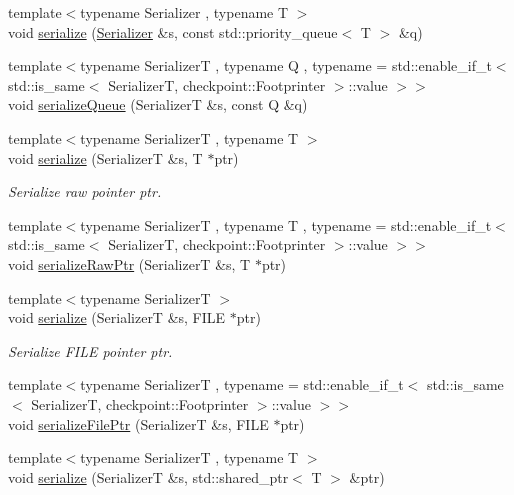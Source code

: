 \begin{DoxyCompactItemize}
{\footnotesize template$<$typename Serializer , typename T $>$ }\\void \hyperlink{namespacecheckpoint_a9493433bed418b54358130463961ce50}{serialize} (\hyperlink{structcheckpoint_1_1_serializer}{Serializer} \&s, const std\+::priority\+\_\+queue$<$ T $>$ \&q)
\item 
{\footnotesize template$<$typename SerializerT , typename Q , typename  = std\+::enable\+\_\+if\+\_\+t$<$    std\+::is\+\_\+same$<$      Serializer\+T,      checkpoint\+::\+Footprinter    $>$\+::value  $>$$>$ }\\void \hyperlink{namespacecheckpoint_a2d9ca0472b4055b11e967503e9b37394}{serialize\+Queue} (SerializerT \&s, const Q \&q)
\item 
{\footnotesize template$<$typename SerializerT , typename T $>$ }\\void \hyperlink{namespacecheckpoint_a40ba90ab8e9263d8d98ad67a322c6f1a}{serialize} (SerializerT \&s, T $\ast$ptr)
\begin{DoxyCompactList}\small\item\em Serialize raw pointer {\ttfamily ptr}. \end{DoxyCompactList}\item 
{\footnotesize template$<$typename SerializerT , typename T , typename  = std\+::enable\+\_\+if\+\_\+t$<$    std\+::is\+\_\+same$<$      Serializer\+T,      checkpoint\+::\+Footprinter    $>$\+::value  $>$$>$ }\\void \hyperlink{namespacecheckpoint_a07f6216d4cee88085750f5a34ecb85df}{serialize\+Raw\+Ptr} (SerializerT \&s, T $\ast$ptr)
\item 
{\footnotesize template$<$typename SerializerT $>$ }\\void \hyperlink{namespacecheckpoint_a975c4d49f9a5a744623fe3df9d7f8655}{serialize} (SerializerT \&s, F\+I\+LE $\ast$ptr)
\begin{DoxyCompactList}\small\item\em Serialize F\+I\+LE pointer {\ttfamily ptr}. \end{DoxyCompactList}\item 
{\footnotesize template$<$typename SerializerT , typename  = std\+::enable\+\_\+if\+\_\+t$<$    std\+::is\+\_\+same$<$      Serializer\+T,      checkpoint\+::\+Footprinter    $>$\+::value  $>$$>$ }\\void \hyperlink{namespacecheckpoint_ad037fd5d89690d3232ec92d54da9f887}{serialize\+File\+Ptr} (SerializerT \&s, F\+I\+LE $\ast$ptr)
\item 
{\footnotesize template$<$typename SerializerT , typename T $>$ }\\void \hyperlink{namespacecheckpoint_a200b46814a9fcae10246577315cc1fa7}{serialize} (SerializerT \&s, std\+::shared\+\_\+ptr$<$ T $>$ \&ptr)

\end{DoxyCompactItemize}
